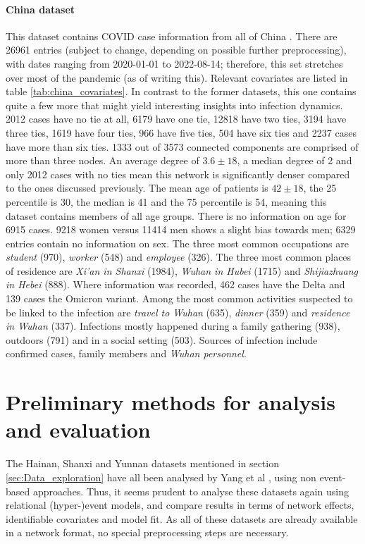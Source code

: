 \documentclass{article}
\begin{document}
	\paragraph{China dataset} This dataset contains COVID case information from all of China \cite{china_publication,china_data}. There are 26961 entries (subject to change, depending on possible further preprocessing), with dates ranging from 2020-01-01 to 2022-08-14; therefore, this set stretches over most of the pandemic (as of writing this). Relevant covariates are listed in table \ref{tab:china_covariates}. In contrast to the former datasets, this one contains quite a few more that might yield interesting insights into infection dynamics. 2012 cases have no tie at all, 6179 have one tie, 12818 have two ties, 3194 have three ties, 1619 have four ties, 966 have five ties, 504 have six ties and 2237 cases have more than six ties. 1333 out of 3573 connected components are comprised of more than three nodes. An average degree of $3.6\pm18$, a median degree of 2 and only 2012 cases with no ties mean this network is significantly denser compared to the ones discussed previously. The mean age of patients is $42\pm18$, the 25 percentile is 30, the median is 41 and the 75 percentile is 54, meaning this dataset contains members of all age groups. There is no information on age for 6915 cases. 9218 women versus 11414 men shows a slight bias towards men; 6329 entries contain no information on sex. The three most common occupations are \emph{student} (970), \emph{worker} (548) and \emph{employee} (326). The three most common places of residence are \emph{Xi'an in Shanxi} (1984), \emph{Wuhan in Hubei} (1715) and \emph{Shijiazhuang in Hebei} (888). Where information was recorded, 462 cases have the Delta and 139 cases the Omicron variant. Among the most common activities suspected to be linked to the infection are \emph{travel to Wuhan} (635), \emph{dinner} (359) and \emph{residence in Wuhan} (337). Infections mostly happened during a family gathering (938), outdoors (791) and in a social setting (503). Sources of infection include confirmed cases, family members and \emph{Wuhan personnel}.
	
	\section{Preliminary methods for analysis and evaluation}
	\label{sec:Methods}
	The Hainan, Shanxi and Yunnan datasets mentioned in section \ref{sec:Data_exploration} have all been analysed by Yang et al \cite{hainan_publication,shanxi_publication}, using non event-based approaches. Thus, it seems prudent to analyse these datasets again using relational (hyper-)event models, and compare results in terms of network effects, identifiable covariates and model fit. As all of these datasets are already available in a network format, no special preprocessing steps are necessary. 
	
\end{document}
